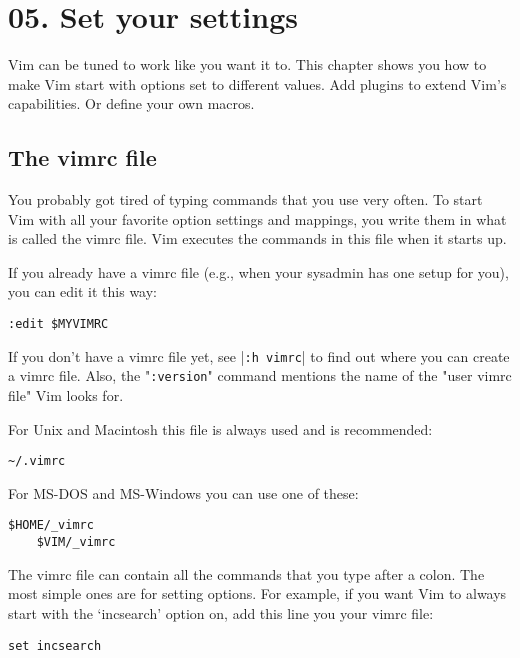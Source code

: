 \section{05. Set your settings}
Vim can be tuned to work like you want it to.  This chapter shows you how to
make Vim start with options set to different values.  Add plugins to extend
Vim's capabilities.  Or define your own macros.
\subsection{The vimrc file}
\label{The vimrc file}
\label{vimrc-intro}

You probably got tired of typing commands that you use very often.
To start Vim with all your favorite option settings and mappings, you write them in what is called the vimrc file.
Vim executes the commands in this file when it starts up.

If you already have a vimrc file (e.g., when your sysadmin has one setup for you), you can edit it this way:

 \begin{Verbatim}[samepage=true]
 :edit $MYVIMRC
 \end{Verbatim}

If you don't have a vimrc file yet, see |\verb!:h vimrc!| to find out where you can create a vimrc file.
Also, the "\verb!:version!" command mentions the name of the "user vimrc file" Vim looks for.

For Unix and Macintosh this file is always used and is recommended:

\begin{Verbatim}[samepage=true]
    ~/.vimrc 
\end{Verbatim}

For MS-DOS and MS-Windows you can use one of these:

\begin{Verbatim}[samepage=true]
    $HOME/_vimrc 
    $VIM/_vimrc 
\end{Verbatim}

The vimrc file can contain all the commands that you type after a colon.
The most simple ones are for setting options.
For example, if you want Vim to always start with the `incsearch' option on, add this line you your vimrc file:

 \begin{Verbatim}[samepage=true]
 set incsearch
 \end{Verbatim}

